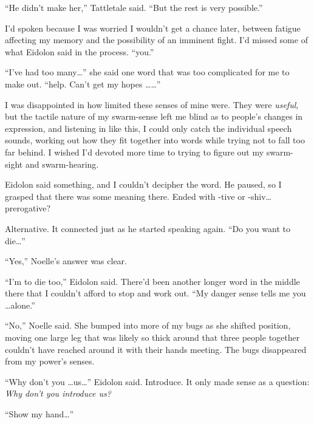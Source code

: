 ``He didn't make her,'' Tattletale said.  ``But the rest is very possible.''



I'd spoken because I was worried I wouldn't get a chance later, between fatigue affecting my memory and the possibility of an imminent fight.  I'd missed some of what Eidolon said in the process.  ``\ldotshelp you.''



``I've had too many\ldots'' she said one word that was too complicated for me to make out.  ``\ldotsof help.  Can't get my hopes \ldots \ldots''



I was disappointed in how limited these senses of mine were.  They were \emph{useful}, but the tactile nature of my swarm-sense left me blind as to people's changes in expression, and listening in like this, I could only catch the individual speech sounds, working out how they fit together into words while trying not to fall too far behind.  I wished I'd devoted more time to trying to figure out my swarm-sight and swarm-hearing.



Eidolon said something, and I couldn't decipher the word.  He paused, so I grasped that there was some meaning there.  Ended with -tive or -shiv\ldots prerogative?



Alternative.  It connected just as he started speaking again.  ``Do you want to die\ldots''



``Yes,'' Noelle's answer was clear.



``I'm \ldotsred to die too,'' Eidolon said.  There'd been another longer word in the middle there that I couldn't afford to stop and work out.  ``My danger sense tells me you \ldots alone.''



``No,'' Noelle said.  She bumped into more of my bugs as she shifted position, moving one large leg that was likely so thick around that three people together couldn't have reached around it with their hands meeting.  The bugs disappeared from my power's senses.



``Why don't you \ldots us\ldots'' Eidolon said.  Introduce.  It only made sense as a question:  \emph{Why don't you introduce us?}



``Show my hand\ldots''




